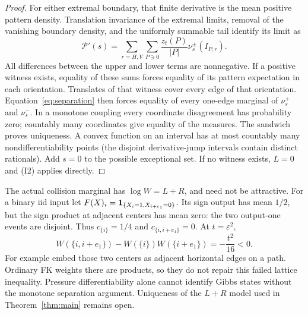 \begin{proof}
For either extremal boundary, that finite derivative is the mean positive pattern density. Translation invariance of the extremal limits, removal of the vanishing boundary density, and the uniformly summable tail identify its limit as
\[
 \mathcal P'(s)=
 \sum_{r=H,V}\sum_{P\ni0}\frac{z_t(P)}{|P|}
                    \nu_s^\pm(I_{P,r}).
\]
All differences between the upper and lower terms are nonnegative. If a positive witness exists, equality of these sums forces equality of its pattern expectation in each orientation. Translates of that witness cover every edge of that orientation. Equation~\eqref{eq:separation} then forces equality of every one-edge marginal of $\nu_s^+$ and $\nu_s^-$. In a monotone coupling every coordinate disagreement has probability zero; countably many coordinates give equality of the measures. The sandwich proves uniqueness. A convex function on an interval has at most countably many nondifferentiability points (the disjoint derivative-jump intervals contain distinct rationals). Add $s=0$ to the possible exceptional set. If no witness exists, $L=0$ and (I2) applies directly.
\end{proof}

\begin{remark}
The actual collision marginal has $\log W=L+R$, and need not be attractive. For a binary iid input let $F(X)_i=\mathbf 1_{\{X_i=1,X_{i+e_1}=0\}}$. Its sign output has mean $1/2$, but the sign product at adjacent centers has mean zero: the two output-one events are disjoint. Thus $c_{\{i\}}=1/4$ and $c_{\{i,i+e_1\}}=0$. At $t=\varepsilon^2$,
\[
 W(\{i,i+e_1\})-W(\{i\})W(\{i+e_1\})
       =-\frac{t^2}{16}<0.
\]
For example embed those two centers as adjacent horizontal edges on a path. Ordinary FK weights there are products, so they do not repair this failed lattice inequality. Pressure differentiability alone cannot identify Gibbs states without the monotone separation argument. Uniqueness of the $L+R$ model used in Theorem~\ref{thm:main} remains open.
\end{remark}

